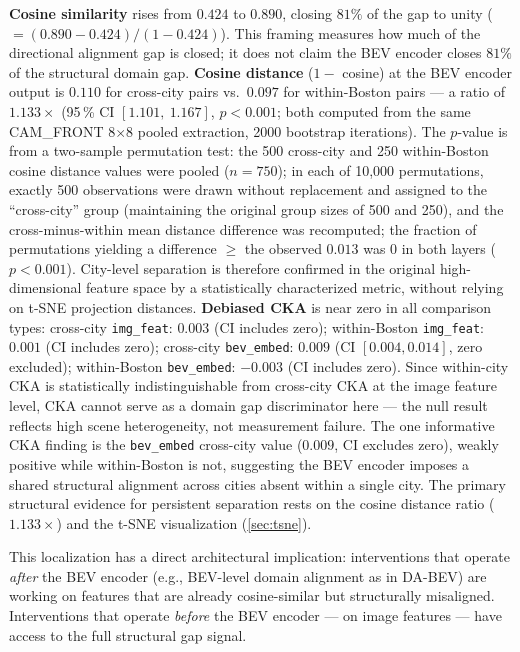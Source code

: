 \documentclass[letterpaper, 10pt, journal]{IEEEtran}
\begin{document}
\textbf{Cosine similarity} rises from $0.424$ to $0.890$, closing $81\%$ of the gap
to unity ($= (0.890{-}0.424)/(1{-}0.424)$).
This framing measures how much of the directional alignment gap is closed; it does not
claim the BEV encoder closes $81\%$ of the structural domain gap.
\textbf{Cosine distance} ($1 -$ cosine) at the BEV encoder output is $0.110$ for
cross-city pairs vs.\ $0.097$ for within-Boston pairs --- a ratio of $1.133\times$
(95\,\% CI $[1.101,\ 1.167]$, $p < 0.001$; both computed from the same
CAM\_FRONT 8$\times$8 pooled extraction, 2000 bootstrap iterations).
The $p$-value is from a two-sample permutation test: the 500 cross-city and 250
within-Boston cosine distance values were pooled ($n{=}750$); in each of 10{,}000
permutations, exactly 500 observations were drawn without replacement and assigned to
the ``cross-city'' group (maintaining the original group sizes of 500 and 250), and
the cross-minus-within mean distance difference was recomputed; the fraction of
permutations yielding a difference $\geq$ the observed $0.013$ was $0$ in
both layers ($p < 0.001$).
City-level separation is therefore confirmed in the original high-dimensional feature
space by a statistically characterized metric, without relying on t-SNE projection
distances.
\textbf{Debiased CKA} is near zero in all comparison types:
cross-city \texttt{img\_feat}: $0.003$ (CI includes zero);
within-Boston \texttt{img\_feat}: $0.001$ (CI includes zero);
cross-city \texttt{bev\_embed}: $0.009$ (CI $[0.004, 0.014]$, zero excluded);
within-Boston \texttt{bev\_embed}: $-0.003$ (CI includes zero).
Since within-city CKA is statistically indistinguishable from cross-city CKA at the
image feature level, CKA cannot serve as a domain gap discriminator here --- the
null result reflects high scene heterogeneity, not measurement failure.
The one informative CKA finding is the \texttt{bev\_embed} cross-city value
($0.009$, CI excludes zero), weakly positive while within-Boston is not, suggesting
the BEV encoder imposes a shared structural alignment across cities absent within
a single city.
The primary structural evidence for persistent separation rests on the cosine distance
ratio ($1.133\times$) and the t-SNE visualization (\cref{sec:tsne}).

This localization has a direct architectural implication: interventions that operate
\emph{after} the BEV encoder (e.g., BEV-level domain alignment as in DA-BEV) are
working on features that are already cosine-similar but structurally misaligned.
Interventions that operate \emph{before} the BEV encoder --- on image features ---
have access to the full structural gap signal.
\end{document}
